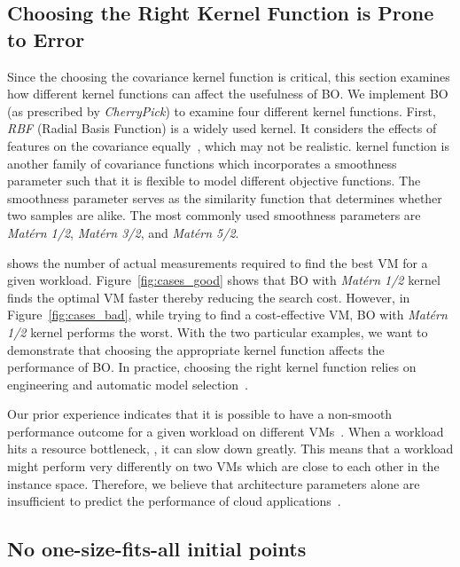 \subsection*{Choosing the Right Kernel Function is Prone to Error}
\label{sec:kernel}
Since the choosing the covariance kernel function is critical, this section examines how different kernel functions can affect the usefulness of BO.
We implement BO (as prescribed by \emph{CherryPick}) to examine four different kernel functions.
First, \emph{RBF} (Radial Basis Function) is a widely used kernel. It considers the effects of features on the covariance equally~\cite{Brochu2010}, which may not be realistic.
 kernel function is another family of covariance functions which incorporates a smoothness parameter such that it is flexible to model different objective functions.
The smoothness parameter serves as the similarity function that determines whether two samples are alike. 
The most commonly used smoothness parameters are \emph{Mat\'ern 1/2}, \emph{Mat\'ern 3/2}, and \emph{Mat\'ern 5/2}.



\myfigure{\ref{fig:kernel_comparison}} shows the number of actual measurements required to find the best VM for a given workload.
Figure~\ref{fig:cases_good} shows that
BO with \emph{Mat\'ern 1/2} kernel finds the optimal VM faster thereby reducing the search cost.
However, in Figure~\ref{fig:cases_bad}, while trying to find a cost-effective VM,
BO with \emph{Mat\'ern 1/2} kernel performs the worst.
With the two particular examples,
we want to demonstrate that choosing the appropriate kernel function affects the performance of BO.
In practice, choosing the right kernel function relies on engineering and automatic model selection~\cite{Brochu2010, Snoek2012, Dewancker2015, shahriari2016taking}.

Our prior experience indicates that it is possible to have a non-smooth performance outcome for a given workload on different VMs~\cite{Hsu2016}.
When a workload hits a resource bottleneck, , it can slow down greatly. This means that a workload might perform very differently on two VMs which are close to each other in the instance space. Therefore, we believe that architecture parameters alone are insufficient to predict the performance of cloud applications~\cite{Yadwadkar2017, Hsu2016}.

\subsection*{No one-size-fits-all initial points}
\label{sec:init_points}

